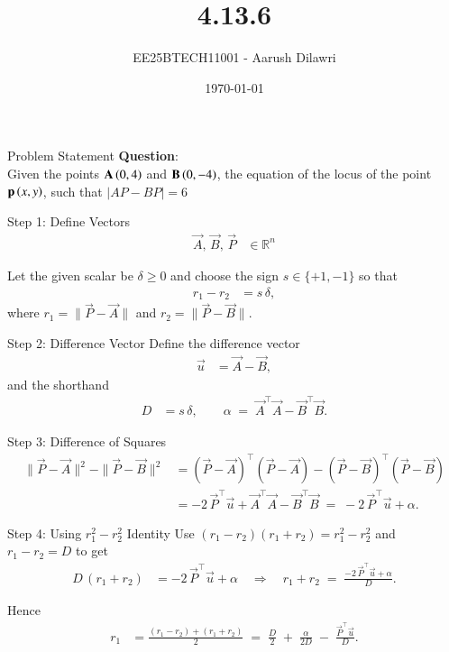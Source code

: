 \documentclass{beamer}
\title{4.13.6}
\date{\today}
\author{EE25BTECH11001 - Aarush Dilawri}
\begin{document}
\frame{\titlepage}

\begin{frame}{Problem Statement}
\textbf{Question}:\\
Given the points $\mathbf{A} \left(0,4\right)$ and $\mathbf{B} \left(0,-4\right)$, the equation of the locus of the point $\mathbf{p}\left(x,y\right)$, such that $\lvert AP -BP \rvert = 6$
\end{frame}

\begin{frame}{Step 1: Define Vectors}
\begin{align}
    \vec{A},\,\vec{B},\,\vec{P} &\in \mathbb{R}^n
\end{align}

Let the given scalar be $ \delta \ge 0 $ and choose the sign $s\in\{+1,-1\}$ so that
\begin{align}
    r_1 - r_2 &= s\,\delta,
\end{align}
where $r_1=\|\vec{P}-\vec{A}\|$ and $r_2=\|\vec{P}-\vec{B}\|$.
\end{frame}

\begin{frame}{Step 2: Difference Vector}
Define the difference vector
\begin{align}
    \vec{u} &= \vec{A}-\vec{B},
\end{align}
and the shorthand
\begin{align}
    D &= s\,\delta, \qquad
    \alpha \;=\; \vec{A}^\top\vec{A} - \vec{B}^\top\vec{B}.
\end{align}
\end{frame}

\begin{frame}{Step 3: Difference of Squares}
\begin{align}
    \|\vec{P}-\vec{A}\|^2 - \|\vec{P}-\vec{B}\|^2
    &= (\vec{P}-\vec{A})^\top(\vec{P}-\vec{A}) - (\vec{P}-\vec{B})^\top(\vec{P}-\vec{B}) \\
    &= -2\,\vec{P}^\top\vec{u} + \vec{A}^\top\vec{A} - \vec{B}^\top\vec{B}
    \;=\; -2\,\vec{P}^\top\vec{u} + \alpha .
\end{align}
\end{frame}

\begin{frame}{Step 4: Using $r_1^2 - r_2^2$ Identity}
Use $(r_1-r_2)(r_1+r_2)=r_1^2-r_2^2$ and $r_1-r_2 = D$ to get
\begin{align}
    D\,(r_1+r_2) &= -2\,\vec{P}^\top\vec{u} + \alpha
    \quad\Longrightarrow\quad
    r_1+r_2 \;=\; \frac{-2\,\vec{P}^\top\vec{u} + \alpha}{D}.
\end{align}

Hence
\begin{align}
    r_1 &= \frac{(r_1-r_2)+(r_1+r_2)}{2}
        \;=\; \frac{D}{2} \;+\; \frac{\alpha}{2D} \;-\; \frac{\vec{P}^\top\vec{u}}{D}.
\end{align}
\end{frame}
\end{document}
